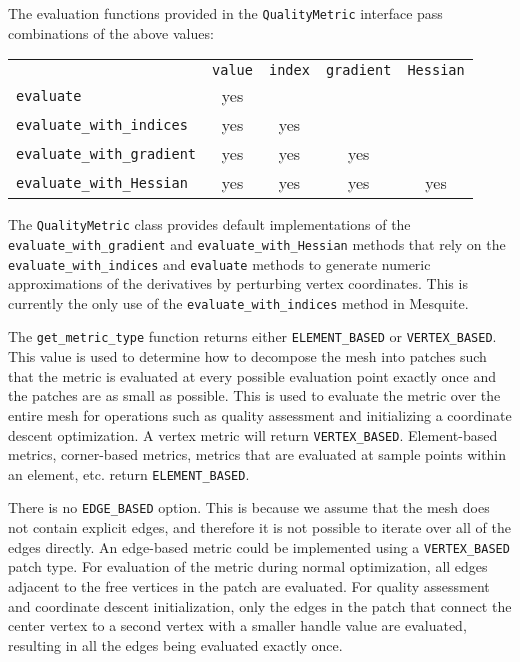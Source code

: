 \documentclass{article}
\begin{document}
The evaluation functions provided in the \texttt{QualityMetric} interface pass combinations of the above values:

\begin{center}
\begin{tabular}{lcccc}
&\texttt{value} & \texttt{index} & \texttt{gradient} & \texttt{Hessian} \\
\texttt{evaluate}                 & yes &     &     &     \\
\texttt{evaluate\_with\_indices}  & yes & yes &     &     \\
\texttt{evaluate\_with\_gradient} & yes & yes & yes &     \\
\texttt{evaluate\_with\_Hessian}  & yes & yes & yes & yes \\
\end{tabular}
\end{center}

The \texttt{QualityMetric} class provides default implementations of the \texttt{evaluate\_with\_gradient} and \texttt{evaluate\_with\_Hessian} methods that rely on the \texttt{evaluate\_with\_indices} and \texttt{evaluate} methods to generate numeric approximations of the derivatives by perturbing vertex coordinates.  This is currently the only use of the \texttt{evaluate\_with\_indices} method in Mesquite.

The \texttt{get\_metric\_type} function returns either \texttt{ELEMENT\_BASED} or \texttt{VERTEX\_BASED}.  This value is used to determine how to decompose the mesh into patches such that the metric is evaluated at every possible evaluation point exactly once and the patches are as small as possible.  This is used to evaluate the metric over the entire mesh for operations such as quality assessment and initializing a coordinate descent optimization.  A vertex metric will return \texttt{VERTEX\_BASED}.  Element-based metrics, corner-based metrics, metrics that are evaluated at sample points within an element, etc. return \texttt{ELEMENT\_BASED}.

There is no \texttt{EDGE\_BASED} option.  This is because we assume that the mesh does not contain explicit edges, and therefore it is not possible to iterate over all of the edges directly.  An edge-based metric could be implemented using a \texttt{VERTEX\_BASED} patch type.  For evaluation of the metric during normal optimization, all edges adjacent to the free vertices in the patch are evaluated.  For quality assessment and coordinate descent initialization, only the edges in the patch that connect the center vertex to a second vertex with a smaller handle value are evaluated, resulting in all the edges being evaluated exactly once.
\end{document}
